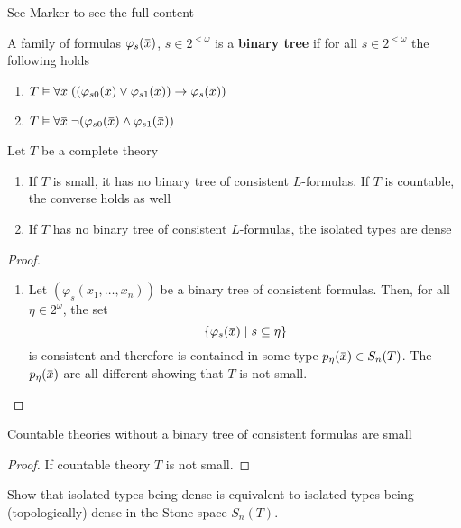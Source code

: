 \documentclass[11pt]{article}
\begin{document}
See Marker to see the full content
\begin{definition}[]
A family of formulas \(\varphi_s(\barx)\), \(s\in 2^{<\omega}\) is a \textbf{binary tree} if for all \(s\in 2^{<\omega}\) the
following holds
\begin{enumerate}
\item \(T\vDash\forall \barx\;((\varphi_{s0}(\barx)\vee\varphi_{s1}(\barx))\to\varphi_s(\barx))\)
\item \(T\vDash\forall\barx\;\neg(\varphi_{s0}(\barx)\wedge\varphi_{s1}(\barx))\)
\end{enumerate}
\end{definition}

\begin{theorem}[]
\label{thm4.5.9}
Let \(T\) be a complete theory
\begin{enumerate}
\item If \(T\) is small, it has no binary tree of consistent \(L\)-formulas. If \(T\) is countable,
the converse holds as well
\item If \(T\) has no binary tree of consistent \(L\)-formulas, the isolated types are dense
\end{enumerate}
\end{theorem}

\begin{proof}
\begin{enumerate}
\item Let \((\varphi_s(x_1,\dots,x_n))\) be a binary tree of consistent formulas. Then, for all \(\eta\in 2^\omega\),
the set
\begin{equation*}
\{\varphi_s(\barx)\mid s\subseteq\eta\}
\end{equation*}
is consistent and therefore is contained in some type \(p_{\eta}(\barx)\in S_n(T)\).
The \(p_\eta(\barx)\) are all different showing that \(T\) is not small.
\end{enumerate}
\end{proof}

\begin{exercise}
Countable theories without a binary tree of consistent formulas are small
\end{exercise}

\begin{proof}
If countable theory \(T\) is not small.
\end{proof}

\begin{exercise}
\label{ex4.5.2}
Show that isolated types being dense is equivalent to isolated types being (topologically) dense
in the Stone space \(S_n(T)\).
\end{exercise}
\end{document}
